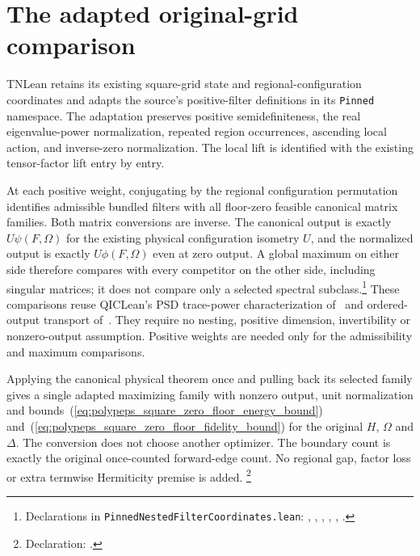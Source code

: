 \documentclass{article}
\begin{document}
\section{The adapted original-grid comparison}

TNLean retains its existing square-grid state and regional-configuration
coordinates and adapts the source's positive-filter definitions in its
\texttt{Pinned} namespace. The adaptation preserves positive semidefiniteness,
the real eigenvalue-power normalization, repeated region occurrences,
ascending local action, and inverse-zero normalization. The local lift is
identified with the existing tensor-factor lift entry by entry.

At each positive weight, conjugating by the regional configuration permutation
identifies admissible bundled filters with all floor-zero feasible canonical
matrix families. Both matrix conversions are inverse. The canonical output
is exactly $U\psi(F,\Omega)$ for the existing physical configuration isometry
$U$, and the normalized output is exactly $U\phi(F,\Omega)$ even at zero
output. A global maximum on either side therefore compares with every
competitor on the other side, including singular matrices; it does not
compare only a selected spectral subclass.\footnote{Declarations in
\texttt{PinnedNestedFilterCoordinates.lean}:
,
,
,
,
,
.}
These comparisons reuse QICLean's PSD trace-power characterization
of~\cite{QICLean2026FilterFeasibility} and ordered-output transport
of~\cite{QICLean2026FilterOutput}. They require no nesting, positive dimension,
invertibility or nonzero-output assumption. Positive weights are needed only
for the admissibility and maximum comparisons.

Applying the canonical physical theorem once and pulling back its selected
family gives a single adapted maximizing family with nonzero output, unit
normalization and bounds~(\ref{eq:polypeps_square_zero_floor_energy_bound})
and~(\ref{eq:polypeps_square_zero_floor_fidelity_bound}) for the original
$H$, $\Omega$ and $\Delta$. The conversion does not choose another optimizer.
The boundary count is exactly the original once-counted forward-edge count.
No regional gap, factor loss or extra termwise Hermiticity premise is added.
\footnote{Declaration:
.}
\end{document}
